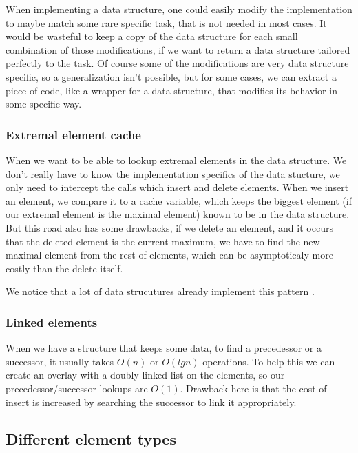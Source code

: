 \documentclass[11pt]{article}
\begin{document}
		When implementing a data structure, one could easily modify the implementation to maybe match some rare
		specific task, that is not needed in most cases. It would be wasteful to keep a copy of the data
		structure for each small combination of those modifications, if we want to return a data structure
		tailored perfectly to the task. Of course some of the modifications are very data structure specific, so
		a generalization isn't possible, but for some cases, we can extract a piece of code, like a wrapper for
		a data structure, that modifies its behavior in some specific way.

		\subsubsection{Extremal element cache}

			When we want to be able to lookup extremal elements in the data structure. We don't really have
			to know the implementation specifics of the data stucture, we only need to intercept the calls
			which insert and delete elements. When we insert an element, we compare it to a cache variable,
			which keeps the biggest element (if our extremal element is the maximal element) known to be in
			the data structure. But this road also has some drawbacks, if we delete an element, and it
			occurs that the deleted element is the current maximum, we have to find the new maximal
			element from the rest of elements, which can be asymptoticaly more costly than the delete
			itself.
			
			We notice that a lot of data strucutures already implement this pattern .

		\subsubsection{Linked elements}

			When we have a structure that keeps some data, to find a precedessor or a successor, it usually
			takes $O(n)$ or $O(lg n)$ operations.  To help this we can create an overlay with a doubly
			linked list on the elements, so our precedessor/successor lookups are $O(1)$. Drawback here is
			that the cost of insert is increased by searching the successor to link it appropriately.
			

	\subsection{Different element types}
\end{document}
